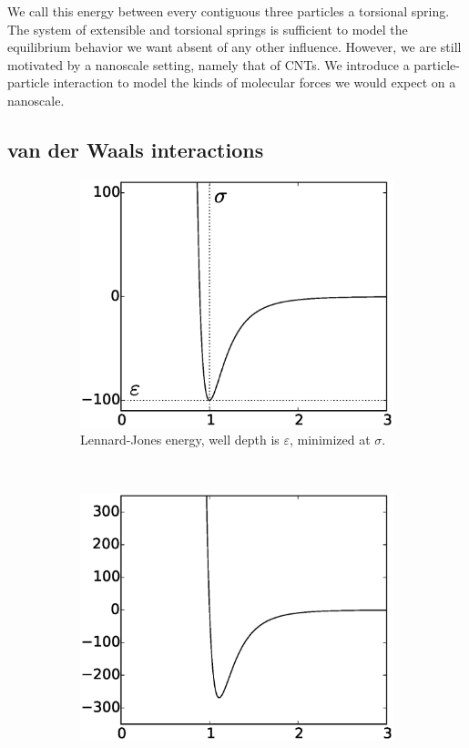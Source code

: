    We call this energy between every contiguous three particles a torsional spring. The system of extensible and torsional springs is sufficient to model the equilibrium behavior we want absent of any other influence. However, we are still motivated by a nanoscale setting, namely that of CNTs. We introduce a particle-particle interaction to model the kinds of molecular forces we would expect on a nanoscale.

\subsection{van der Waals interactions}	

	\begin{figure}[t!]
		\centering
		\begin{subfigure}[t]{.5\textwidth}
			\centering
			\includegraphics[scale=.5]{./fig/ch2/lj_e.eps}
			\caption{Lennard-Jones energy, well depth is $\varepsilon$, minimized at $\sigma$. \label{subfig:LJEnergy}}
		\end{subfigure}%
		~
		\begin{subfigure}[t]{.5\textwidth}
			\centering
			\includegraphics[scale=.5]{./fig/ch2/lj_f.eps}

\end{subfigure}
\end{figure}
